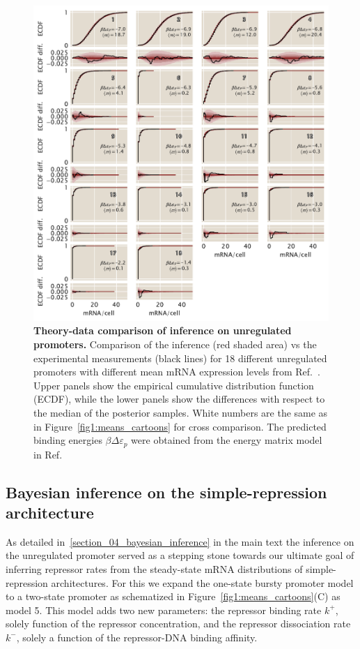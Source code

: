 \begin{figure}[p]
\centering
\includegraphics{../figures/si/figS0X_ppc.pdf}
\caption{\textbf{Theory-data comparison of inference on unregulated promoters.}
Comparison of the inference (red shaded area) vs the experimental measurements
(black lines) for 18 different unregulated promoters with different mean mRNA
expression levels from Ref.~\cite{Jones2014}. Upper panels show the empirical
cumulative distribution function (ECDF), while the lower panels show the
differences with respect to the median of the posterior samples. White numbers
are the same as in Figure~\ref{fig1:means_cartoons} for cross comparison. The
predicted binding energies $\beta\Delta\varepsilon_p$ were obtained from the
energy matrix model in Ref.~\cite{Brewster2012}}
\label{figS:ppc_unreg}
\end{figure}

\subsection{Bayesian inference on the simple-repression architecture}

As detailed in~\ref{section_04_bayesian_inference} in the main text the
inference on the unregulated promoter served as a stepping stone towards our
ultimate goal of inferring repressor rates from the steady-state mRNA
distributions of simple-repression architectures. For this we expand the
one-state bursty promoter model to a two-state promoter as schematized in
Figure~\ref{fig1:means_cartoons}(C) as model 5. This model adds two new
parameters: the repressor binding rate $k^+$, solely function of the repressor
concentration, and the repressor dissociation rate $k^-$, solely a function of
the repressor-DNA binding affinity.

